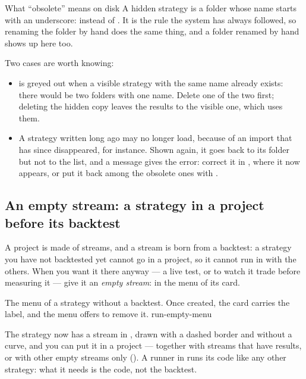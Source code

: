\begin{nota}{What \enquote{obsolete} means on disk}
A hidden strategy is a folder whose name starts with an underscore:
 instead of . It is the
rule the system has always followed, so renaming the folder by hand does the
same thing, and a folder renamed by hand shows up here too.
\end{nota}

Two cases are worth knowing:
\begin{itemize}
  \item {} is greyed out when a visible strategy with the
    same name already exists: there would be two folders with one name.
    Delete one of the two first; deleting the hidden copy leaves the results
    to the visible one, which uses them.
  \item A strategy written long ago may no longer load, because of an import
    that has since disappeared, for instance. Shown again, it goes back to its
    folder but not to the list, and a message gives the error: correct it in
    , where it now appears, or put it back among the obsolete
    ones with .
\end{itemize}

\subsection{An empty stream: a strategy in a project before its backtest}\label{sez:run-empty}

A project is made of streams, and a stream is born from a backtest: a
strategy you have not backtested yet cannot go in a project, so it cannot
run in  with the others. When you want it there anyway --- a live
test, or to watch it trade before measuring it --- give it an \emph{empty
stream}:  in the menu of its card.

  {The menu of a strategy without a backtest. Once created, the card carries
   the  label, and the menu offers to remove it.}
  {run-empty-menu}

\noindent
The strategy now has a stream in , drawn with a dashed border
and without a curve, and you can put it in a project --- together with
streams that have results, or with other empty streams only
(). A runner in  runs its code like any
other strategy: what it needs is the code, not the backtest.

